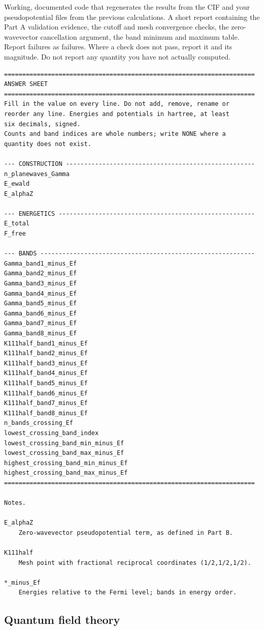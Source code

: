 
Working, documented code that regenerates the results from the CIF and your pseudopotential files from the previous calculations. A
short report containing the Part A validation evidence, the cutoff and mesh convergence checks, the
zero-wavevector cancellation argument, the band minimum and maximum table. Report failures as failures. Where a check does not pass, report it and its magnitude. Do not report any quantity
you have not actually computed.

\begin{lstlisting}
=====================================================================
ANSWER SHEET 
=====================================================================
Fill in the value on every line. Do not add, remove, rename or
reorder any line. Energies and potentials in hartree, at least
six decimals, signed.
Counts and band indices are whole numbers; write NONE where a
quantity does not exist.

--- CONSTRUCTION ----------------------------------------------------
n_planewaves_Gamma
E_ewald
E_alphaZ

--- ENERGETICS ------------------------------------------------------
E_total
F_free

--- BANDS -----------------------------------------------------------
Gamma_band1_minus_Ef
Gamma_band2_minus_Ef
Gamma_band3_minus_Ef
Gamma_band4_minus_Ef
Gamma_band5_minus_Ef
Gamma_band6_minus_Ef
Gamma_band7_minus_Ef
Gamma_band8_minus_Ef
K111half_band1_minus_Ef
K111half_band2_minus_Ef
K111half_band3_minus_Ef
K111half_band4_minus_Ef
K111half_band5_minus_Ef
K111half_band6_minus_Ef
K111half_band7_minus_Ef
K111half_band8_minus_Ef
n_bands_crossing_Ef
lowest_crossing_band_index
lowest_crossing_band_min_minus_Ef
lowest_crossing_band_max_minus_Ef
highest_crossing_band_min_minus_Ef
highest_crossing_band_max_minus_Ef
=====================================================================

Notes.

E_alphaZ
    Zero-wavevector pseudopotential term, as defined in Part B.

K111half
    Mesh point with fractional reciprocal coordinates (1/2,1/2,1/2).

*_minus_Ef
    Energies relative to the Fermi level; bands in energy order.

\end{lstlisting}

\subsection{Quantum field theory}
\label{problems:mathematical-qft}

